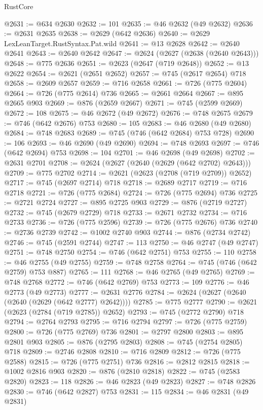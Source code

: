 \begin{lexlean}{RustCore}
\begin{coremodule}
@2631 := @634 @2630
@2632 := 101
@2635 := @46 @2632 (@49 @2632)
@2636 := @2631 @2635
@2638 := @2629 (@642 @2636)
@2640 := @2629 LexLeanTarget.RustSyntax.Pat.wild
@2641 := @13 @2628
@2642 := @2640 @2641
@2643 := @2640 @2642
@2647 := @2624 (@2627 (@2638 (@2640 @2643)))
@2648 := @775 @2636
@2651 := @2623 (@2647 (@719 @2648))
@2652 := @13 @2622
@2654 := @2621 (@2651 @2652)
@2657 := @745 (@2617 @2654) @718
@2658 := @2609 @2657
@2659 := @716 @2658
@2661 := @726 (@775 @2604)
@2664 := @726 (@775 @2614) @736
@2665 := @2661 @2664
@2667 := @895 @2665 @903
@2669 := @876 (@2659 @2667)
@2671 := @745 (@2599 @2669)
@2672 := 108
@2675 := @46 @2672 (@49 @2672)
@2676 := @748 @2675
@2679 := @746 (@642 @2676) @753
@2680 := 105
@2683 := @46 @2680 (@49 @2680)
@2684 := @748 @2683
@2689 := @745 (@746 (@642 @2684) @753 @728)
@2690 := 106
@2693 := @46 @2690 (@49 @2690)
@2694 := @748 @2693
@2697 := @746 (@642 @2694) @753
@2698 := 104
@2701 := @46 @2698 (@49 @2698)
@2702 := @2631 @2701
@2708 := @2624 (@2627 (@2640 (@2629 (@642 @2702) @2643)))
@2709 := @775 @2702
@2714 := @2621 (@2623 (@2708 (@719 @2709)) @2652)
@2717 := @745 (@2697 @2714) @718
@2718 := @2689 @2717
@2719 := @716 @2718
@2721 := @726 (@775 @2684)
@2724 := @726 (@775 @2694) @736
@2725 := @2721 @2724
@2727 := @895 @2725 @903
@2729 := @876 (@2719 @2727)
@2732 := @745 (@2679 @2729) @718
@2733 := @2671 @2732
@2734 := @716 @2733
@2736 := @726 (@775 @2596)
@2739 := @726 (@775 @2676) @736
@2740 := @2736 @2739
@2742 := @1002 @2740 @903
@2744 := @876 (@2734 @2742)
@2746 := @745 (@2591 @2744)
@2747 := 113
@2750 := @46 @2747 (@49 @2747)
@2751 := @748 @2750
@2754 := @746 (@642 @2751) @753
@2755 := 110
@2758 := @46 @2755 (@49 @2755)
@2759 := @748 @2758
@2764 := @745 (@746 (@642 @2759) @753 @887)
@2765 := 111
@2768 := @46 @2765 (@49 @2765)
@2769 := @748 @2768
@2772 := @746 (@642 @2769) @753
@2773 := 109
@2776 := @46 @2773 (@49 @2773)
@2777 := @2631 @2776
@2784 := @2624 (@2627 (@2640 (@2640 (@2629 (@642 @2777) @2642))))
@2785 := @775 @2777
@2790 := @2621 (@2623 (@2784 (@719 @2785)) @2652)
@2793 := @745 (@2772 @2790) @718
@2794 := @2764 @2793
@2795 := @716 @2794
@2797 := @726 (@775 @2759)
@2800 := @726 (@775 @2769) @736
@2801 := @2797 @2800
@2803 := @895 @2801 @903
@2805 := @876 (@2795 @2803)
@2808 := @745 (@2754 @2805) @718
@2809 := @2746 @2808
@2810 := @716 @2809
@2812 := @726 (@775 @2588)
@2815 := @726 (@775 @2751) @736
@2816 := @2812 @2815
@2818 := @1002 @2816 @903
@2820 := @876 (@2810 @2818)
@2822 := @745 (@2583 @2820)
@2823 := 118
@2826 := @46 @2823 (@49 @2823)
@2827 := @748 @2826
@2830 := @746 (@642 @2827) @753
@2831 := 115
@2834 := @46 @2831 (@49 @2831)

\end{coremodule}
\end{lexlean}
